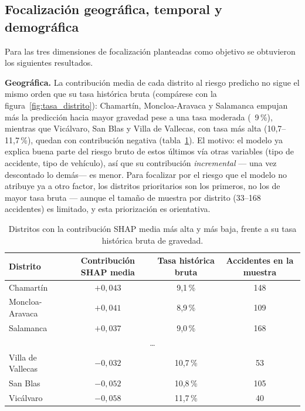 \documentclass[11pt,a4paper]{article}
\begin{document}
\subsection{Focalización geográfica, temporal y demográfica}
\label{sec:focalizacion}

Para las tres dimensiones de focalización planteadas como objetivo se obtuvieron los siguientes resultados.

\textbf{Geográfica.} La contribución media de cada distrito al riesgo predicho no sigue el mismo orden que su tasa histórica bruta (compárese con la figura~\ref{fig:tasa_distrito}): Chamartín, Moncloa-Aravaca y Salamanca empujan más la predicción hacia mayor gravedad pese a una tasa moderada (~9\,\%), mientras que Vicálvaro, San Blas y Villa de Vallecas, con tasa más alta (10,7--11,7\,\%), quedan con contribución negativa (tabla~\ref{tab:distritos}). El motivo: el modelo ya explica buena parte del riesgo bruto de estos últimos vía otras variables (tipo de accidente, tipo de vehículo), así que su contribución \emph{incremental} --- una vez descontado lo demás--- es menor. Para focalizar por el riesgo que el modelo no atribuye ya a otro factor, los distritos prioritarios son los primeros, no los de mayor tasa bruta --- aunque el tamaño de muestra por distrito (33--168 accidentes) es limitado, y esta priorización es orientativa.

\begin{table}[h]
\centering
\small
\begin{tabular}{lccc}
\toprule
\textbf{Distrito} & \textbf{Contribución SHAP media} & \textbf{Tasa histórica bruta} & \textbf{Accidentes en la muestra} \\
\midrule
Chamartín & $+0{,}043$ & 9,1\,\% & 148 \\
Moncloa-Aravaca & $+0{,}041$ & 8,9\,\% & 109 \\
Salamanca & $+0{,}037$ & 9,0\,\% & 168 \\
\multicolumn{4}{c}{\dots} \\
Villa de Vallecas & $-0{,}032$ & 10,7\,\% & 53 \\
San Blas & $-0{,}052$ & 10,8\,\% & 105 \\
Vicálvaro & $-0{,}058$ & 11,7\,\% & 40 \\
\bottomrule
\end{tabular}
\caption{Distritos con la contribución SHAP media más alta y más baja, frente a su tasa histórica bruta de gravedad.}
\label{tab:distritos}
\end{table}
\end{document}
